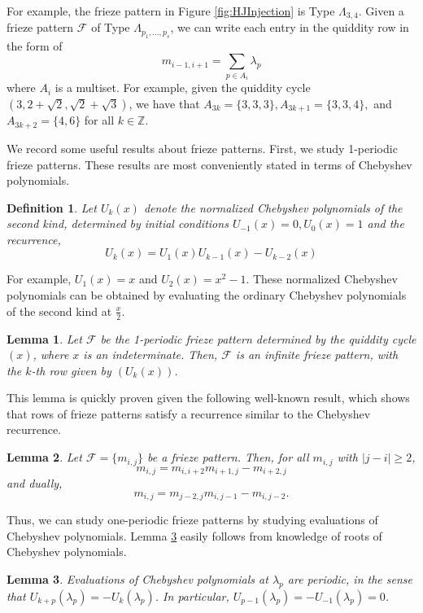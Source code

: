 \documentclass[12pt]{article}
\newtheorem{definition}{Definition}
\newtheorem{lemma}{Lemma}
\theoremstyle{remark}
\newcommand*{\qm}[1]{m_{#1-1,#1+1}}
\newcommand*{\Z}{\mathbb{Z}}
\begin{document}
For example, the frieze pattern in Figure \ref{fig:HJInjection} is Type $\Lambda_{3,4}$.
Given a frieze pattern $\mathcal{F}$ of Type $\Lambda_{p_1,\ldots,p_s}$, we can write each entry in the quiddity row in the form of \[
\qm{i} = \sum_{p\in A_i}\lambda_{p}
\]
where $A_i$ is a multiset. For example, given the quiddity cycle $(3, 2+\sqrt{2}, \sqrt{2} + \sqrt{3})$, we have that $A_{3k} = \{3,3,3\}, A_{3k+1} = \{ 3,3,4 \},$ and $A_{3k+2} = \{4,6\}$ for all $k \in \Z$.

We record some useful results about frieze patterns. First, we study 1-periodic frieze patterns. These results are most conveniently stated in terms of Chebyshev polynomials. 

\begin{definition}\label{def:Chebyshev}
Let $U_k(x)$ denote the \emph{normalized Chebyshev polynomials of the second kind}, determined by initial conditions $U_{-1}(x) = 0, U_0(x) = 1$ and the recurrence,\[
U_k(x)= U_1(x)U_{k-1}(x) - U_{k-2}(x)
\]
\end{definition}

For example, $U_1(x) = x$ and $U_2(x) = x^2 - 1$. These normalized Chebyshev polynomials can be obtained by evaluating the ordinary Chebyshev polynomials of the second kind at $\frac{x}{2}$. 

\begin{lemma}\label{lem:OnePeriodicFrieze}
Let $\mathcal{F}$ be the 1-periodic frieze pattern determined by the quiddity cycle $(x)$, where $x$ is an indeterminate. Then, $\mathcal{F}$ is an infinite frieze pattern, with the $k$-th row given by $(U_k(x))$. 
\end{lemma}

This lemma is quickly proven given the following well-known result, which shows that rows of frieze patterns satisfy a recurrence similar to the Chebyshev recurrence. 

\begin{lemma}\label{lem:DivisionFreeFrieze}
Let $\mathcal{F} = \{m_{i,j}\}$ be a frieze pattern. Then, for all $m_{i,j}$ with $\vert j - i \vert \geq 2$,\[
m_{i,j} = m_{i,i+2}m_{i+1,j} - m_{i+2,j}
\]
and dually,\[
m_{i,j} = m_{j-2,j}m_{i,j-1} - m_{i,j-2}.
\]
\end{lemma}

Thus, we can study one-periodic frieze patterns by studying evaluations of Chebyshev polynomials. Lemma \ref{lem:ChebyPeriodic} easily follows from knowledge of roots of Chebyshev polynomials.

\begin{lemma}\label{lem:ChebyPeriodic}
Evaluations of Chebyshev polynomials at $\lambda_p$ are periodic, in the sense that  $U_{k+p}(\lambda_p) = -U_{k}(\lambda_p)$. In particular, $U_{p-1}(\lambda_p) = -U_{-1}(\lambda_p) = 0$. 
\end{lemma}
\end{document}
